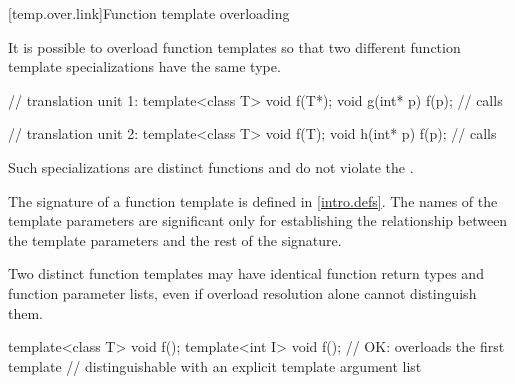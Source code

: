 [temp.over.link]{Function template overloading}

\pnum
{}%
It is possible to overload function templates so that two different
function template specializations have the same type.
\begin{example}

\begin{minipage}{.45\hsize}
\begin{codeblock}
// translation unit 1:
template<class T>
  void f(T*);
void g(int* p) {
  f(p); // calls 
}
\end{codeblock}
\end{minipage}
\begin{minipage}{.45\hsize}
\begin{codeblock}
// translation unit 2:
template<class T>
  void f(T);
void h(int* p) {
  f(p); // calls 
}
\end{codeblock}
\end{minipage}

\end{example}

\pnum
Such specializations are distinct functions and do not violate the
.

\pnum
The signature of a function template
is defined in \ref{intro.defs}.
The names of the template parameters are significant only for establishing
the relationship between the template parameters and the rest of the
signature.
\begin{note}
Two distinct function templates may have identical function return types and
function parameter lists, even if overload resolution alone cannot distinguish
them.

\begin{codeblock}
template<class T> void f();
template<int I> void f();       // OK: overloads the first template
                                // distinguishable with an explicit template argument list
\end{codeblock}
\end{note}

